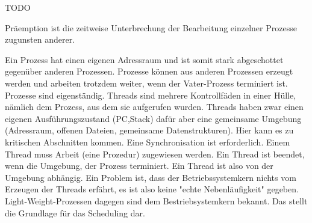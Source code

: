 \begin{answer}
TODO 
\end{answer}

\begin{answer}
Präemption ist die zeitweise Unterbrechung der Bearbeitung einzelner Prozesse zugunsten anderer.
\end{answer}

\begin{answer}
Ein Prozess hat einen eigenen Adressraum und ist somit stark abgeschottet gegenüber anderen
Prozessen. Prozesse können aus anderen Prozessen erzeugt werden und arbeiten trotzdem weiter,
wenn der Vater-Prozess terminiert ist. Prozesse sind eigenständig.
Threads sind mehrere Kontrollfäden in einer Hülle, nämlich dem Prozess, aus dem sie aufgerufen
wurden. Threads haben zwar einen eigenen Ausführungszustand (PC,Stack) dafür aber eine
gemeinsame Umgebung (Adressraum, offenen Dateien, gemeinsame Datenstrukturen). Hier kann
es zu kritischen Abschnitten kommen. Eine Synchronisation ist erforderlich. Einem Thread muss
Arbeit (eine Prozedur) zugewiesen werden. Ein Thread ist beendet, wenn die Umgebung, der Prozess
terminiert. Ein Thread ist also von der Umgebung abhängig.
Ein Problem ist, dass der Betriebssystemkern nichts vom Erzeugen der Threads erfährt, es ist also
keine "echte Nebenläufigkeit" gegeben.
Light-Weight-Prozessen dagegen sind dem Bestriebsystemkern bekannt. Das stellt die Grundlage
für das Scheduling dar.
\end{answer}

